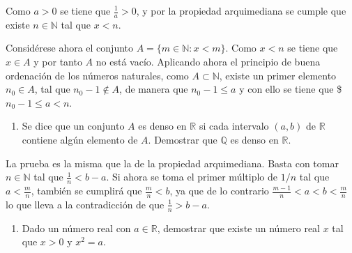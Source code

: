 \documentclass[
  letterpaper,
  DIV=11,
  numbers=noendperiod]{scrreport}
\providecommand{\tightlist}{%
  \setlength{\itemsep}{0pt}\setlength{\parskip}{0pt}}\usepackage{longtable,booktabs,array}
\theoremstyle{definition}
\theoremstyle{remark}
\begin{document}
\begin{tcolorbox}[enhanced jigsaw, bottomtitle=1mm, opacityback=0, coltitle=black, toprule=.15mm, colback=white, titlerule=0mm, rightrule=.15mm, title=\textcolor{quarto-callout-tip-color}{\faLightbulb}\hspace{0.5em}{Solución}, breakable, bottomrule=.15mm, colbacktitle=quarto-callout-tip-color!10!white, toptitle=1mm, opacitybacktitle=0.6, left=2mm, leftrule=.75mm, colframe=quarto-callout-tip-color-frame, arc=.35mm]
Como \(a>0\) se tiene que \(\frac{1}{a}>0\), y por la propiedad
arquimediana se cumple que existe \(n\in \mathbb{N}\) tal que \(x<n\).

Considérese ahora el conjunto \(A=\{m\in \mathbb{N}: x<m\}\). Como
\(x<n\) se tiene que \(x\in A\) y por tanto \(A\) no está vacío.
Aplicando ahora el principio de buena ordenación de los números
naturales, como \(A\subset \mathbb{N}\), existe un primer elemento
\(n_0\in A\), tal que \(n_0-1\not\in A\), de manera que \(n_0-1\leq a\)
y con ello se tiene que \$\(n_0-1\leq a<n\).
\end{tcolorbox}

\begin{enumerate}
\def\labelenumi{\arabic{enumi}.}
\setcounter{enumi}{1}
\tightlist
\item
  Se dice que un conjunto \(A\) es denso en \(\mathbb{R}\) si cada
  intervalo \((a,b)\) de \(\mathbb{R}\) contiene algún elemento de
  \(A\). Demostrar que \(\mathbb{Q}\) es denso en \(\mathbb{R}\).
\end{enumerate}

\begin{tcolorbox}[enhanced jigsaw, bottomtitle=1mm, opacityback=0, coltitle=black, toprule=.15mm, colback=white, titlerule=0mm, rightrule=.15mm, title=\textcolor{quarto-callout-tip-color}{\faLightbulb}\hspace{0.5em}{Solución}, breakable, bottomrule=.15mm, colbacktitle=quarto-callout-tip-color!10!white, toptitle=1mm, opacitybacktitle=0.6, left=2mm, leftrule=.75mm, colframe=quarto-callout-tip-color-frame, arc=.35mm]
La prueba es la misma que la de la propiedad arquimediana. Basta con
tomar \(n\in \mathbb{N}\) tal que \(\frac{1}{n}< b-a\). Si ahora se toma
el primer múltiplo de \(1/n\) tal que \(a<\frac{m}{n}\), también se
cumplirá que \(\frac{m}{n}<b\), ya que de lo contrario
\(\frac{m-1}{n}<a<b<\frac{m}{n}\) lo que lleva a la contradicción de que
\(\frac{1}{n}>b-a\).
\end{tcolorbox}

\begin{enumerate}
\def\labelenumi{\arabic{enumi}.}
\setcounter{enumi}{2}
\tightlist
\item
  Dado un número real con \(a\in\mathbb{R}\), demostrar que existe un
  número real \(x\) tal que \(x>0\) y \(x^2=a\).
\end{enumerate}
\end{document}
